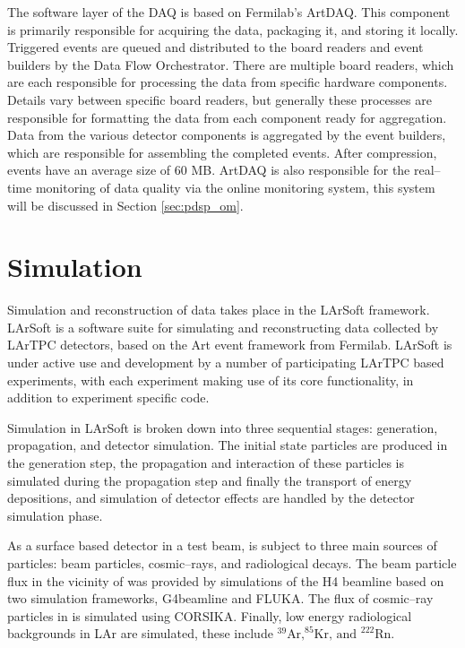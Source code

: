 The software layer of the \protodune{} DAQ is based on Fermilab's 
ArtDAQ\cite{6495515}. This component is primarily responsible for acquiring 
the data, packaging it, and storing it locally. Triggered events are queued 
and distributed to the board readers and event builders by the Data Flow 
Orchestrator. There are multiple board readers, which are each responsible for 
processing the data from specific hardware components. Details vary between 
specific board readers, but generally these processes are responsible for 
formatting the data from each component ready for aggregation. Data from the 
various detector components is aggregated by the event builders, which are 
responsible for assembling the completed events. After compression, events have 
an average size of 60 MB. ArtDAQ is also responsible for the real--time 
monitoring of data quality via the online monitoring system, this system will 
be discussed in Section \ref{sec:pdsp_om}.

\section{Simulation} \label{sec:simulation}

Simulation and reconstruction of \protodune{} data takes place in the LArSoft
framework\cite{Snider2017}. LArSoft is a software suite for simulating and
reconstructing data collected by LArTPC detectors, based on the Art event 
framework from Fermilab\cite{Green:2012gv}. LArSoft is under active use and
development by a number of participating LArTPC based experiments, with each
experiment making use of its core functionality, in addition to experiment 
specific code. 

Simulation in LArSoft is broken down into three sequential stages: generation,
propagation, and detector simulation. The initial state particles are produced
in the generation step, the propagation and interaction of these particles is 
simulated during the propagation step and finally the transport of energy 
depositions, and simulation of detector effects are handled by the detector 
simulation phase.

As a surface based detector in a test beam, \protodune{} is subject to three
main sources of particles: beam particles, cosmic--rays, and radiological 
decays. The beam particle flux in the vicinity of \protodune{} was provided by 
simulations of the H4 beamline\cite{Booth:2019brj} based on two simulation 
frameworks, G4beamline\cite{g4beamline} and FLUKA\cite{BOHLEN2014211}. The flux
of cosmic--ray particles in \protodune{} is simulated using 
CORSIKA\cite{Heck:1998vt}.  Finally, low energy radiological backgrounds in 
LAr are simulated, these include $^{39}\mbox{Ar,} ^ {85}\mbox{Kr, and } 
^{222}\mbox{Rn}$.

